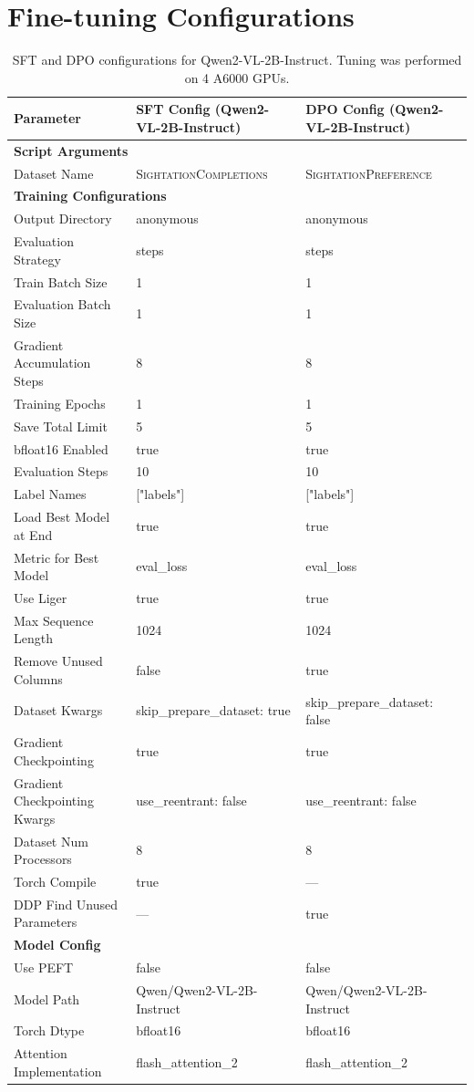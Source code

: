 \section{Fine-tuning Configurations}\label{app:tuning_config}


\begin{table}[t!]
\centering
\small
\begin{tabularx}{\textwidth}{lXX}
\toprule
\textbf{Parameter} & \textbf{SFT Config (Qwen2-VL-2B-Instruct)} & \textbf{DPO Config (Qwen2-VL-2B-Instruct)} \\ 
\midrule
\multicolumn{3}{l}{\textbf{Script Arguments}} \\
Dataset Name & \textsc{SightationCompletions} & \textsc{SightationPreference} \\
\midrule
\multicolumn{3}{l}{\textbf{Training Configurations}} \\
Output Directory & anonymous & anonymous \\
Evaluation Strategy & steps & steps \\
Train Batch Size & 1 & 1 \\
Evaluation Batch Size & 1 & 1 \\
Gradient Accumulation Steps & 8 & 8 \\
Training Epochs & 1 & 1 \\
Save Total Limit & 5 & 5 \\
bfloat16 Enabled & true & true \\
Evaluation Steps & 10 & 10 \\
Label Names & ["labels"] & ["labels"] \\
Load Best Model at End & true & true \\
Metric for Best Model & eval\_loss & eval\_loss \\
Use Liger & true & true \\
Max Sequence Length & 1024 & 1024 \\
Remove Unused Columns & false & true \\
Dataset Kwargs & skip\_prepare\_dataset: true & skip\_prepare\_dataset: false \\
Gradient Checkpointing & true & true \\
Gradient Checkpointing Kwargs & use\_reentrant: false & use\_reentrant: false \\
Dataset Num Processors & 8 & 8 \\
Torch Compile & true & --- \\
DDP Find Unused Parameters & --- & true \\
\midrule
\multicolumn{3}{l}{\textbf{Model Config}} \\
Use PEFT & false & false \\
Model Path & Qwen/Qwen2-VL-2B-Instruct & Qwen/Qwen2-VL-2B-Instruct \\
Torch Dtype & bfloat16 & bfloat16 \\
Attention Implementation & flash\_attention\_2 & flash\_attention\_2 \\
\bottomrule
\end{tabularx}
\caption{SFT and DPO configurations for Qwen2-VL-2B-Instruct. Tuning was performed on 4 \texttimes A6000 GPUs.
}
\label{tab:tuning_config_2b_sft_dpo}
\end{table}

